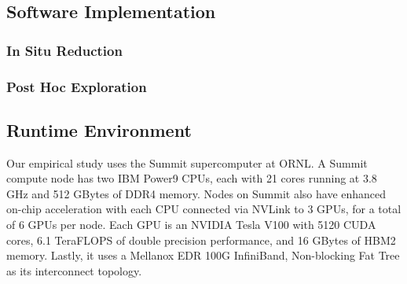 \subsection{Software Implementation}
\label{sec:infra}
\subsubsection{In Situ Reduction}
\label{sec:insituimp}

\subsubsection{Post Hoc Exploration}



\subsection{Runtime Environment}
\label{sec:runtime}
Our empirical study uses the Summit supercomputer at ORNL. 
%
A Summit compute node has two IBM Power9 CPUs, each with 21 cores running at 3.8 GHz and 512 GBytes of DDR4 memory. 
%
Nodes on Summit also have enhanced on-chip acceleration with each CPU connected via NVLink to 3 GPUs, for a total of 6 GPUs per node. 
%
Each GPU is an NVIDIA Tesla V100 with 5120 CUDA cores, 6.1 TeraFLOPS of double precision performance, and 16 GBytes of HBM2 memory.
%
Lastly, it uses a Mellanox EDR 100G InfiniBand, Non-blocking Fat Tree as its interconnect topology.

%



%
%
%
%
%
%

